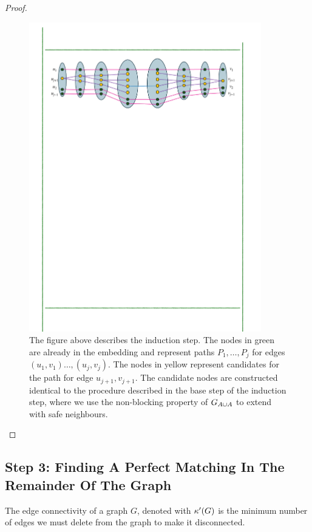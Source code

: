 \documentclass[11pt]{article}
\begin{document}
\begin{proof}
\begin{figure}
	\includegraphics[width=0.9\textwidth
	]{assets/InductionStep.pdf}
	\caption{The figure above describes the induction step. The nodes in green are already in the embedding and represent paths $P_1, \dots, P_j$ for edges $(u_1, v_1) \dots, (u_j, v_j)$.
	The nodes in yellow represent candidates for the path for edge $u_{j+1}, v_{j+1}$. 
	The candidate nodes are constructed identical to the procedure described in the base step of the induction step, where we use the non-blocking property of $G_{A \cup A}$ to extend with safe neighbours. 
	}
	\label{fig:induction}
\end{figure}

	
\end{proof}

\subsection{Step 3: Finding A Perfect Matching In The Remainder Of The Graph}

\begin{definition}\label{def:edge-connectivity}
The edge connectivity of a graph $G$, denoted with $\kappa'(G)$ is the minimum number of edges we must delete from the graph to make it disconnected.	
\end{definition}
\end{document}
